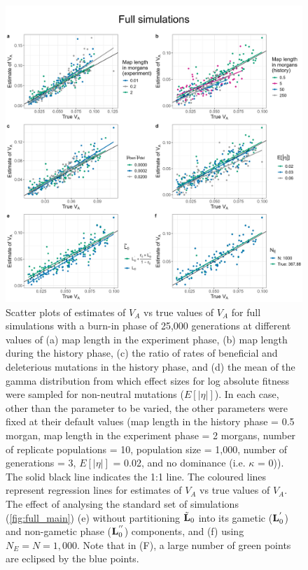 \documentclass[12pt]{article}
\begin{document}
\begin{bibunit}
\begin{figure}[H]
\includegraphics[scale = 0.12]{Figures/full_params.jpg}
\caption{Scatter plots of estimates of $V_A$ vs true values of $V_A$ for full simulations with a burn-in phase of 25,000 generations at different values of (a) map length in the experiment phase, (b) map length during the history phase, (c) the ratio of rates of beneficial and deleterious mutations in the history phase, and (d) the mean of the gamma distribution from which effect sizes for log absolute fitness were sampled for non-neutral mutations ($E[|\eta|]$). In each case, other than the parameter to be varied, the other parameters were fixed at their default values (map length in the history phase = 0.5 morgan, map length in the experiment phase = 2 morgans, number of replicate populations = 10, population size = 1,000, number of generations = 3, $E[|\eta|]$ = 0.02, and no dominance (i.e. $\kappa$ = 0)). The solid black line indicates the 1:1 line. The coloured lines represent regression lines for estimates of $V_A$ vs true values of $V_A$. The effect of analysing the standard set of simulations (\ref{fig:full_main}) (e) without partitioning $\tilde{\bf L}_0$ into its gametic (${\bf L}^{'}_{0}$) and non-gametic phase (${\bf L}^{''}_{0}$) components, and (f) using $N_E = N = 1,000$. Note that in (F), a large number of green points are eclipsed by the blue points.}
\label{fig:full_params}
\end{figure}



\end{bibunit}
\end{document}
